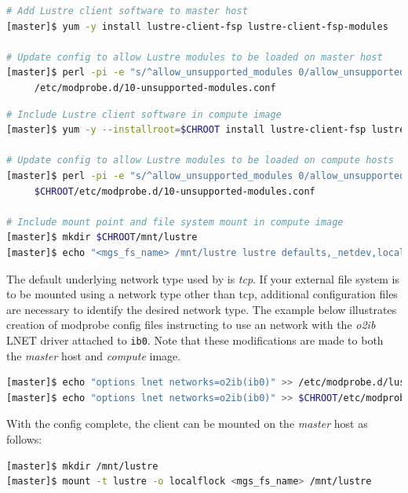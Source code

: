 \documentclass[letterpaper]{article}
\begin{document}
\newpage
\begin{lstlisting}[language=bash,keywords={},upquote=true]
# Add Lustre client software to master host
[master]$ yum -y install lustre-client-fsp lustre-client-fsp-modules

# Update config to allow Lustre modules to be loaded on master host
[master]$ perl -pi -e "s/^allow_unsupported_modules 0/allow_unsupported_modules 1/" \
     /etc/modprobe.d/10-unsupported-modules.conf
\end{lstlisting}

\begin{lstlisting}[language=bash,keywords={},upquote=true]
# Include Lustre client software in compute image
[master]$ yum -y --installroot=$CHROOT install lustre-client-fsp lustre-client-fsp-modules

# Update config to allow Lustre modules to be loaded on compute hosts
[master]$ perl -pi -e "s/^allow_unsupported_modules 0/allow_unsupported_modules 1/" \
     $CHROOT/etc/modprobe.d/10-unsupported-modules.conf

# Include mount point and file system mount in compute image
[master]$ mkdir $CHROOT/mnt/lustre
[master]$ echo "<mgs_fs_name> /mnt/lustre lustre defaults,_netdev,localflock 0 0" >> $CHROOT/etc/fstab
\end{lstlisting}

The default underlying network type used by \Lustre{} is {\em tcp}. If your
external \Lustre{} file system is to be mounted using a network type other than
tcp, additional configuration files are necessary to identify the desired
network type. The example below illustrates creation of modprobe config files
instructing \Lustre{} to use an \InfiniBand{} network with the {\em o2ib} LNET driver
attached to \texttt{ib0}. Note that these modifications are made to both the
{\em master} host and {\em compute} image.

\begin{lstlisting}[language=bash,keywords={},upquote=true]
[master]$ echo "options lnet networks=o2ib(ib0)" >> /etc/modprobe.d/lustre.conf
[master]$ echo "options lnet networks=o2ib(ib0)" >> $CHROOT/etc/modprobe.d/lustre.conf
\end{lstlisting}

With the \Lustre{} config complete, the client can be mounted on the {\em master}
host as follows:
\begin{lstlisting}[language=bash,keywords={},upquote=true]
[master]$ mkdir /mnt/lustre
[master]$ mount -t lustre -o localflock <mgs_fs_name> /mnt/lustre
\end{lstlisting}
\end{document}
